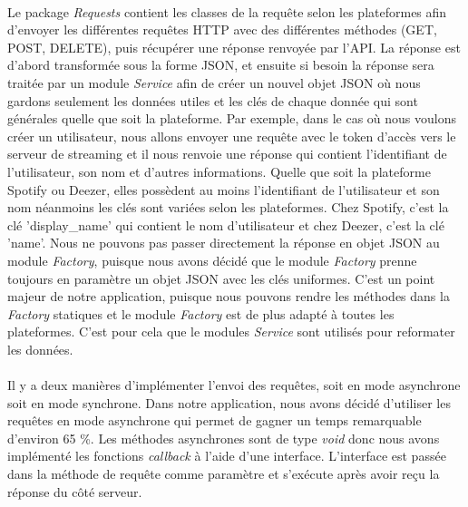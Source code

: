 \documentclass[12pt, openany]{report}
\begin{document}
\paragraph{}Le package \textit{Requests} contient les classes de la requête selon les plateformes afin d'envoyer les différentes requêtes HTTP avec des différentes méthodes (GET, POST, DELETE), puis récupérer une réponse renvoyée par l'API. La réponse est d'abord transformée sous la forme JSON, et ensuite si besoin la réponse sera traitée par un module \textit{Service} afin de créer un nouvel objet JSON où nous gardons seulement les données utiles et les clés de chaque donnée qui sont générales quelle que soit la plateforme. Par exemple, dans le cas où nous voulons créer un utilisateur, nous allons envoyer une requête avec le token d'accès vers le serveur de streaming et il nous renvoie une réponse qui contient l'identifiant de l'utilisateur, son nom et d'autres informations. Quelle que soit la plateforme Spotify ou Deezer, elles possèdent au moins l'identifiant de l'utilisateur et son nom néanmoins les clés sont variées selon les plateformes. Chez Spotify, c'est la clé 'display\_name' qui contient le nom d'utilisateur et chez Deezer, c'est la clé 'name'. Nous ne pouvons pas passer directement la réponse en objet JSON au module \textit{Factory}, puisque nous avons décidé que le module \textit{Factory} prenne toujours en paramètre un objet JSON avec les clés uniformes. C'est un point majeur de notre application, puisque nous pouvons rendre les méthodes dans la \textit{Factory} statiques et le module \textit{Factory} est de plus adapté à toutes les plateformes. C'est pour cela que le modules \textit{Service} sont utilisés pour reformater les données.

\paragraph{}Il y a deux manières d'implémenter l'envoi des requêtes, soit en mode asynchrone soit en mode synchrone. Dans notre application, nous avons décidé d'utiliser les requêtes en mode asynchrone qui permet de gagner un temps remarquable d'environ 65 \%. Les méthodes asynchrones sont de type \textit{void} donc nous avons implémenté les fonctions \textit{callback} à l'aide d'une interface. L'interface est passée dans la méthode de requête comme paramètre et s'exécute après avoir reçu la réponse du côté serveur.
\end{document}
